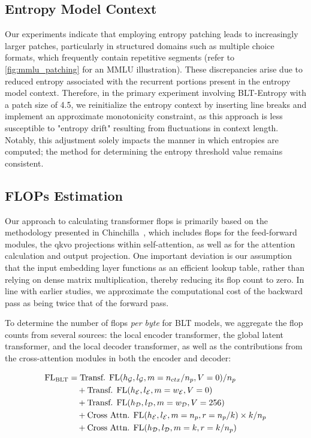 \subsection{Entropy Model Context}
\label{section:entropy-context}
Our experiments indicate that employing entropy patching leads to increasingly larger patches, particularly in structured domains such as multiple choice formats, which frequently contain repetitive segments (refer to \autoref{fig:mmlu_patching} for an MMLU illustration). These discrepancies arise due to reduced entropy associated with the recurrent portions present in the entropy model context. Therefore, in the primary experiment involving {\textsc BLT}-Entropy with a patch size of 4.5, we reinitialize the entropy context by inserting line breaks and implement an approximate monotonicity constraint, as this approach is less susceptible to "entropy drift" resulting from fluctuations in context length. Notably, this adjustment solely impacts the manner in which entropies are computed; the method for determining the entropy threshold value remains consistent.

\subsection{FLOPs Estimation} 
\label{section:flops}

Our approach to calculating transformer flops is primarily based on the methodology presented in Chinchilla~\citep{hoffmann2022training}, which includes flops for the feed-forward modules, the qkvo projections within self-attention, as well as for the attention calculation and output projection. One important deviation is our assumption that the input embedding layer functions as an efficient lookup table, rather than relying on dense matrix multiplication, thereby reducing its flop count to zero. In line with earlier studies, we approximate the computational cost of the backward pass as being twice that of the forward pass.

To determine the number of flops \textit{per byte} for {\textsc BLT} models, we aggregate the flop counts from several sources: the local encoder transformer, the global latent transformer, and the local decoder transformer, as well as the contributions from the cross-attention modules in both the encoder and decoder:

\begin{align}
    \text{FL}_{\text{{\textsc BLT}}} &= \text{Transf. FL}(h_{\mathcal{G}}, l_{\mathcal{G}}, m=n_{ctx}/n_p, V=0) / n_p\\
    &\quad +\text{Transf. FL}(h_{\mathcal{E}}, l_{\mathcal{E}}, m=w_{\mathcal{E}}, V=0) \\
    &\quad + \text{Transf. FL}(h_{\mathcal{D}}, l_{\mathcal{D}}, m=w_{\mathcal{D}}, V=256) \\
    &\quad + \text{Cross Attn. FL}(h_{\mathcal{E}}, l_{\mathcal{E}}, m=n_p, r=n_p/k) \times k/n_p \\
    &\quad + \text{Cross Attn. FL}(h_{\mathcal{D}}, l_{\mathcal{D}}, m=k, r=k/n_p)
\end{align}

